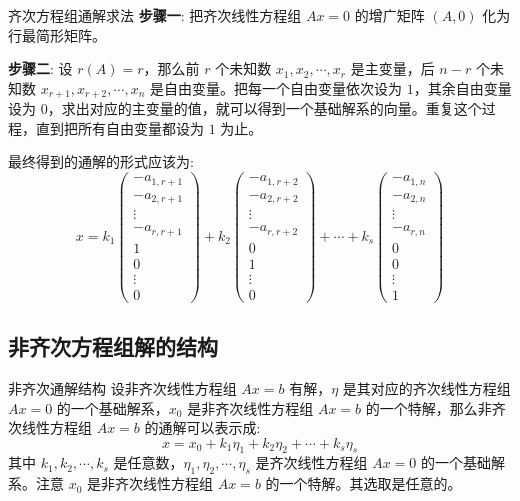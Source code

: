 \documentclass[a4paper,12pt]{ctexart}
\begin{document}
\begin{myalgo}{齐次方程组通解求法}{}
\textbf{步骤一}: 把齐次线性方程组 $Ax=0$ 的增广矩阵 $(A,0)$ 化为行最简形矩阵。

\textbf{步骤二}: 设 $r(A) = r$，那么前 $r$ 个未知数 $x_1, x_2, \cdots, x_r$ 是主变量，后 $n-r$ 个未知数 $x_{r+1}, x_{r+2}, \cdots, x_n$ 是自由变量。把每一个自由变量依次设为 $1$，其余自由变量设为 $0$，求出对应的主变量的值，就可以得到一个基础解系的向量。重复这个过程，直到把所有自由变量都设为 $1$ 为止。

最终得到的通解的形式应该为:
\[
x = k_1 \begin{pmatrix} 
-a_{1, r+1} \\ -a_{2, r+1} \\ \vdots \\ -a_{r, r+1} \\ 1 \\ 0 \\ \vdots \\ 0 
\end{pmatrix} + k_2 \begin{pmatrix} 
-a_{1, r+2} \\ -a_{2, r+2} \\ \vdots \\ -a_{r, r+2} \\ 0 \\ 1 \\ \vdots \\ 0 
\end{pmatrix} + \cdots + k_{s} \begin{pmatrix} 
-a_{1, n} \\ -a_{2, n} \\ \vdots \\ -a_{r, n} \\ 0 \\ 0 \\ \vdots \\ 1 
\end{pmatrix}
\]
\end{myalgo}

\newpage

\subsection{非齐次方程组解的结构}

\begin{mythm}{非齐次通解结构}{}
    设非齐次线性方程组 $Ax=b$ 有解，$\eta$ 是其对应的齐次线性方程组 $Ax=0$ 的一个基础解系，$x_0$ 是非齐次线性方程组 $Ax=b$ 的一个特解，那么非齐次线性方程组 $Ax=b$ 的通解可以表示成:
    \[
    x = x_0 + k_1 \eta_1 + k_2 \eta_2 + \cdots + k_s \eta_s
    \]
    其中 $k_1, k_2, \cdots , k_s$ 是任意数，$\eta_1, \eta_2, \cdots, \eta_s$ 是齐次线性方程组 $Ax=0$ 的一个基础解系。注意 $x_0$ 是非齐次线性方程组 $Ax=b$ 的一个特解。其选取是任意的。
\end{mythm}
\end{document}
